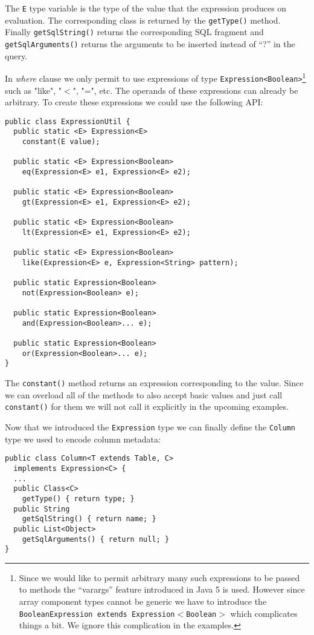 \documentclass{sig-alternate}
\begin{document}
The \verb!E! type variable is the type of the value that the expression produces on evaluation. The corresponding class is returned by the \verb!getType()! method. Finally \verb!getSqlString()! returns the corresponding SQL fragment and \verb!getSqlArguments()! returns the arguments to be inserted instead of ``?'' in the query. 

In \emph{where} clause we only permit to use expressions of type \verb!Expression<Boolean>!\footnote{Since we would like to permit arbitrary many such expressions to be passed to methods the ``varargs'' feature introduced in Java 5 is used. However since array component types cannot be generic we have to introduce the \texttt{BooleanExpression extends Expression$<$Boolean$>$} which complicates things a bit. We ignore this complication in the examples.} such as "like", "$<$", "=", etc. The operands of these expressions can already be arbitrary. To create these expressions we could use the following API:

\begin{verbatim}
public class ExpressionUtil {
  public static <E> Expression<E> 
    constant(E value);

  public static <E> Expression<Boolean> 
    eq(Expression<E> e1, Expression<E> e2);

  public static <E> Expression<Boolean> 
    gt(Expression<E> e1, Expression<E> e2);

  public static <E> Expression<Boolean> 
    lt(Expression<E> e1, Expression<E> e2);

  public static <E> Expression<Boolean> 
    like(Expression<E> e, Expression<String> pattern);

  public static Expression<Boolean> 
    not(Expression<Boolean> e);

  public static Expression<Boolean> 
    and(Expression<Boolean>... e);

  public static Expression<Boolean> 
    or(Expression<Boolean>... e);
}
\end{verbatim}

The \verb!constant()! method returns an expression corresponding to the value. Since we can overload all of the methods to also accept basic values and just call \verb!constant()! for them we will not call it explicitly in the upcoming examples.

Now that we introduced the \verb!Expression! type we can finally define the \verb!Column! type we used to encode column metadata:

\begin{verbatim}
public class Column<T extends Table, C> 
  implements Expression<C> {
  ...
  public Class<C> 
    getType() { return type; }
  public String 
    getSqlString() { return name; }
  public List<Object> 
    getSqlArguments() { return null; }		
}
\end{verbatim}
\end{document}
